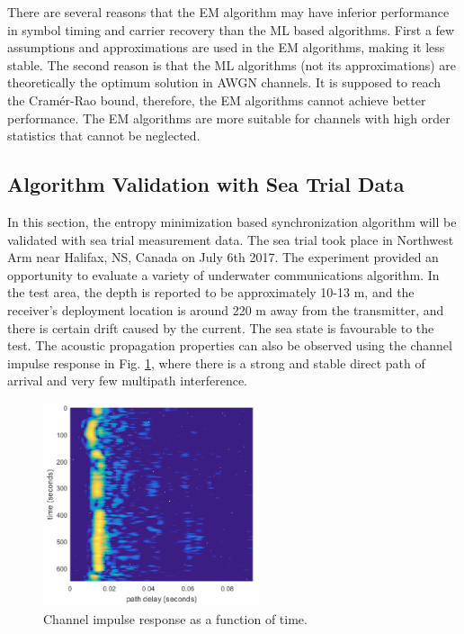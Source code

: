 \documentclass[journal,comsoc]{IEEEtran}
\begin{document}
There are several reasons that the EM algorithm may have inferior performance in symbol timing and carrier recovery than the ML based algorithms.
First a few assumptions and approximations are used in the EM algorithms, making it less stable.
The second reason is that the ML algorithms (not its approximations) are theoretically the optimum solution in AWGN channels. 
It is supposed to reach the Cram\'er-Rao bound, therefore, the EM algorithms cannot achieve better performance.
The EM algorithms are more suitable for channels with high order statistics that cannot be neglected.


\subsection{Algorithm Validation with Sea Trial Data }
\label{sec:validation}
In this section, the entropy minimization based synchronization algorithm will be validated with sea trial  measurement data. 
The sea trial took place in Northwest Arm near Halifax, NS, Canada on July 6th 2017. The experiment provided an opportunity to evaluate a variety of underwater communications algorithm.
In the test area, the depth is reported to be approximately 10-13 m, and the receiver's deployment location is around 220 m away from the transmitter, and there is certain drift caused by the current.
The sea state is favourable to the test. The acoustic propagation properties can also be observed using the channel impulse response in Fig. \ref{fig:chan_impu}, where there is a strong and stable direct path of arrival and very few multipath interference.
\begin{figure}[htbp]
\centering
\includegraphics[width=2.5in]{pic/channel.png}
\caption{Channel impulse response as a function of time.}
\label{fig:chan_impu} 
\end{figure}
\end{document}
